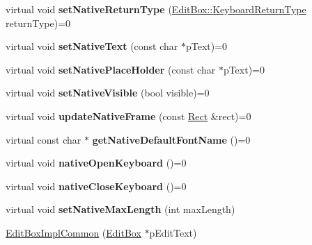 \begin{DoxyCompactItemize}
virtual void {\bfseries set\+Native\+Return\+Type} (\hyperlink{classui_1_1EditBox_a1e1285b6f742975b26bdeb8108ca6e51}{Edit\+Box\+::\+Keyboard\+Return\+Type} return\+Type)=0
\item 
\mbox{\label{classui_1_1EditBoxImplCommon_aece93799db4e0f57ea841ed450a6580f}} 
virtual void {\bfseries set\+Native\+Text} (const char $\ast$p\+Text)=0
\item 
\mbox{\label{classui_1_1EditBoxImplCommon_ac17ce9bfb2ed55f5411afb5683a6cc92}} 
virtual void {\bfseries set\+Native\+Place\+Holder} (const char $\ast$p\+Text)=0
\item 
\mbox{\label{classui_1_1EditBoxImplCommon_afe447cbc3919f371c4d2931a92948b5a}} 
virtual void {\bfseries set\+Native\+Visible} (bool visible)=0
\item 
\mbox{\label{classui_1_1EditBoxImplCommon_aa156a0229508b57a75539d1a64882c37}} 
virtual void {\bfseries update\+Native\+Frame} (const \hyperlink{classRect}{Rect} \&rect)=0
\item 
\mbox{\label{classui_1_1EditBoxImplCommon_a424aa227e4462d4abf19ea73efc55a71}} 
virtual const char $\ast$ {\bfseries get\+Native\+Default\+Font\+Name} ()=0
\item 
\mbox{\label{classui_1_1EditBoxImplCommon_a26c5b695b9b0e41b125acf96cb45aaef}} 
virtual void {\bfseries native\+Open\+Keyboard} ()=0
\item 
\mbox{\label{classui_1_1EditBoxImplCommon_a21d3c53e5332196a161093f5202c1e77}} 
virtual void {\bfseries native\+Close\+Keyboard} ()=0
\item 
\mbox{\label{classui_1_1EditBoxImplCommon_a2e529a5473972dad1c40441f989ad7fe}} 
virtual void {\bfseries set\+Native\+Max\+Length} (int max\+Length)
\item 
\hyperlink{classui_1_1EditBoxImplCommon_adbe38c744b0a41d37097fa3e70d0d4a3}{Edit\+Box\+Impl\+Common} (\hyperlink{classui_1_1EditBox}{Edit\+Box} $\ast$p\+Edit\+Text)
\item 

\end{DoxyCompactItemize}
